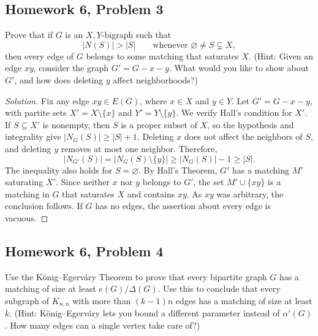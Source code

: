 \documentclass[12pt]{amsart}
\newenvironment{solution}{\begin{proof}[Solution]}{\end{proof}}
\begin{document}
    \subsection*{Homework 6, Problem 3} Prove that if \(G\) is an \(X,Y\)-bigraph such that
    \[
        |N(S)| > |S|
        \qquad \text{whenever } \varnothing \neq S \subsetneq X,
    \]
    then every edge of \(G\) belongs to some matching that saturates \(X\).
    (Hint: Given an edge \(xy\), consider the graph
    \(G' = G-x-y\). What would you like to show about \(G'\), and how
    does deleting \(y\) affect neighborhoods?)

    \begin{solution}
        Fix any edge \(xy\in E(G)\), where \(x\in X\) and \(y\in Y\).
        Let \(G'=G-x-y\), with partite sets \(X'=X\setminus\{x\}\)
        and \(Y'=Y\setminus\{y\}\). We verify Hall's condition for \(X'\).
        If \(S\subseteq X'\) is nonempty, then \(S\) is a proper subset
        of \(X\), so the hypothesis and integrality give
        \(|N_G(S)|\geq |S|+1\). Deleting \(x\) does not affect the
        neighbors of \(S\), and deleting \(y\) removes at most one neighbor.
        Therefore,
        \[
            |N_{G'}(S)|=|N_G(S)\setminus\{y\}|
            \geq |N_G(S)|-1\geq |S|.
        \]
        The inequality also holds for \(S=\varnothing\). By Hall's Theorem,
        \(G'\) has a matching \(M'\) saturating \(X'\). Since neither
        \(x\) nor \(y\) belongs to \(G'\), the set \(M'\cup\{xy\}\)
        is a matching in \(G\) that saturates \(X\) and contains \(xy\).
        As \(xy\) was arbitrary, the conclusion follows. If \(G\) has
        no edges, the assertion about every edge is vacuous.
    \end{solution}

    \subsection*{Homework 6, Problem 4} Use the K\"onig--Egerv\'ary Theorem to prove that every bipartite
    graph \(G\) has a matching of size at least \(e(G)/\Delta(G)\).
    Use this to conclude that every subgraph of \(K_{n,n}\) with more
    than \((k-1)n\) edges has a matching of size at least \(k\).
    (Hint: K\"onig--Egerv\'ary lets you bound a different parameter
    instead of \(\alpha'(G)\). How many edges can a single vertex
    take care of?)
\end{document}
